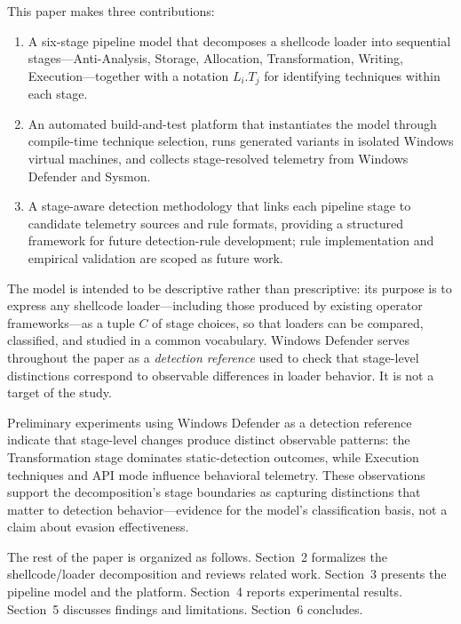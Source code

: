 This paper makes three contributions:

\begin{enumerate}[leftmargin=*, itemsep=2pt]
    \item A six-stage pipeline model that decomposes a shellcode loader into sequential stages---Anti-Analysis, Storage, Allocation, Transformation, Writing, Execution---together with a notation $L_i.T_j$ for identifying techniques within each stage.

    \item An automated build-and-test platform that instantiates the model through compile-time technique selection, runs generated variants in isolated Windows virtual machines, and collects stage-resolved telemetry from Windows Defender and Sysmon.

    \item A stage-aware detection methodology that links each pipeline stage to candidate telemetry sources and rule formats, providing a structured framework for future detection-rule development; rule implementation and empirical validation are scoped as future work.
\end{enumerate}

The model is intended to be descriptive rather than prescriptive: its purpose is to express any shellcode loader---including those produced by existing operator frameworks---as a tuple $C$ of stage choices, so that loaders can be compared, classified, and studied in a common vocabulary.
Windows Defender serves throughout the paper as a \textit{detection reference} used to check that stage-level distinctions correspond to observable differences in loader behavior.
It is not a target of the study.

Preliminary experiments using Windows Defender as a detection reference indicate that stage-level changes produce distinct observable patterns: the Transformation stage dominates static-detection outcomes, while Execution techniques and API mode influence behavioral telemetry.
These observations support the decomposition's stage boundaries as capturing distinctions that matter to detection behavior---evidence for the model's classification basis, not a claim about evasion effectiveness.

The rest of the paper is organized as follows.
Section~2 formalizes the shellcode/loader decomposition and reviews related work.
Section~3 presents the pipeline model and the platform.
Section~4 reports experimental results.
Section~5 discusses findings and limitations.
Section~6 concludes.
